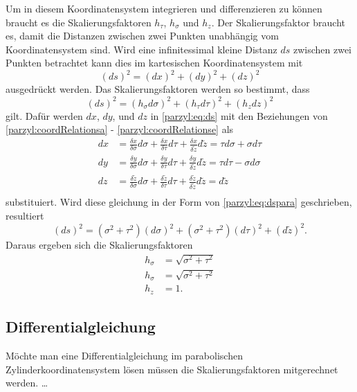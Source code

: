 Um in diesem Koordinatensystem integrieren und differenzieren zu 
können braucht es die Skalierungsfaktoren $h_{\tau}$, $h_{\sigma}$ und $h_{z}$.
Der Skalierungsfaktor braucht es, damit die Distanzen zwischen zwei 
Punkten unabhängig vom Koordinatensystem sind.
Wird eine infinitessimal kleine Distanz $ds$ zwischen zwei Punkten betrachtet
kann dies im kartesischen Koordinatensystem mit
\begin{equation}
    \left(ds\right)^2 = \left(dx\right)^2 + \left(dy\right)^2 + 
    \left(dz\right)^2
    \label{parzyl:eq:ds}
\end{equation}
ausgedrückt werden.
Das Skalierungsfaktoren werden so bestimmt, dass
\begin{equation}
    \left(ds\right)^2 = \left(h_{\sigma}d\sigma\right)^2 + 
    \left(h_{\tau}d\tau\right)^2 + \left(h_z dz\right)^2
\label{parzyl:eq:dspara}
\end{equation}
gilt.
Dafür werden $dx$, $dy$, und $dz$ in \eqref{parzyl:eq:ds} mit den Beziehungen
von \eqref{parzyl:coordRelationsa} - \eqref{parzyl:coordRelationse} als
\begin{align}
    dx  &= \frac{\delta x }{\delta \sigma} d\sigma + 
        \frac{\delta x }{\delta \tau} d\tau + 
        \frac{\delta x }{\delta \tilde{z}} d \tilde{z} 
        = \tau d\sigma + \sigma d \tau \\
    dy &= \frac{\delta y }{\delta \sigma} d\sigma + 
        \frac{\delta y }{\delta \tau} d\tau +
        \frac{\delta y }{\delta \tilde{z}} d \tilde{z} 
        = \tau d\tau - \sigma d \sigma \\
    dz &= \frac{\delta \tilde{z} }{\delta \sigma} d\sigma + 
        \frac{\delta \tilde{z} }{\delta \tau} d\tau +
        \frac{\delta \tilde{z} }{\delta \tilde{z}} d \tilde{z} 
        = d \tilde{z} \\
\end{align}
substituiert.
Wird diese gleichung in der Form von \eqref{parzyl:eq:dspara}
geschrieben, resultiert
\begin{equation}
    \left(d s\right)^2 = 
        \left(\sigma^2 + \tau^2\right)\left(d\sigma\right)^2 + 
        \left(\sigma^2 + \tau^2\right)\left(d\tau\right)^2 +
        \left(d \tilde{z}\right)^2.
\end{equation}
Daraus ergeben sich die Skalierungsfaktoren 
\begin{align}
    h_{\sigma} &= \sqrt{\sigma^2 + \tau^2}\\
    h_{\sigma} &= \sqrt{\sigma^2 + \tau^2}\\
    h_{z} &= 1.
\end{align}
\subsection{Differentialgleichung}
Möchte man eine Differentialgleichung im parabolischen 
Zylinderkoordinatensystem lösen müssen die Skalierungsfaktoren
mitgerechnet werden. 
\dots
